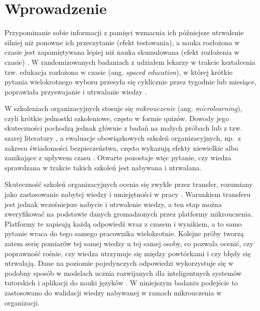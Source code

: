 \section{Wprowadzenie}

Przypominanie sobie informacji z pamięci wzmacnia ich późniejsze utrwalenie silniej niż ponowne
ich przeczytanie (efekt testowania), a nauka rozłożona w czasie jest zapamiętywana lepiej niż nauka
skumulowana (efekt rozłożenia w czasie) \citep{roediger2006,cepeda2006,cepeda2008}. W randomizowanych
badaniach z udziałem lekarzy w trakcie kształcenia tzw. edukacja rozłożona w czasie (ang.
\emph{spaced education}), w której krótkie pytania wielokrotnego wyboru przesyła się cyklicznie
przez tygodnie lub miesiące, poprawiała przyswajanie i utrwalanie wiedzy
\citep{kerfoot2007urology,kerfoot2007mededuc,kerfoot2009}.

W szkoleniach organizacyjnych stosuje się \emph{mikrouczenie} (ang. \emph{microlearning}), czyli
krótkie jednostki szkoleniowe, często w formie quizów. Dowody jego skuteczności pochodzą jednak głównie
z badań na małych próbach lub z tzw. szarej literatury \citep{taylor2022}, a ewaluacje obowiązkowych
szkoleń organizacyjnych, np.\ z zakresu świadomości bezpieczeństwa, często wykazują efekty niewielkie
albo zanikające z upływem czasu \citep{reinheimer2020,lain2022,ho2025}. Otwarte pozostaje więc
pytanie, czy wiedza sprawdzana w trakcie takich szkoleń jest nabywana i utrwalana.

Skuteczność szkoleń organizacyjnych ocenia się zwykle przez transfer, rozumiany jako zastosowanie
nabytej wiedzy i umiejętności w pracy \citep{baldwin1988,blume2010}. Warunkiem transferu jest jednak
wcześniejsze nabycie i utrwalenie wiedzy, a ten etap można zweryfikować na podstawie danych
gromadzonych przez platformy mikrouczenia. Platformy te zapisują każdą odpowiedź wraz z czasem
i wynikiem, a to samo pytanie wraca do tego samego pracownika wielokrotnie. Kolejne próby tworzą
zatem serię pomiarów tej samej wiedzy u tej samej osoby, co pozwala ocenić, czy poprawność rośnie,
czy wiedza utrzymuje się między powtórkami i czy błędy się utrwalają. Dane na poziomie pojedynczych
odpowiedzi wykorzystuje się w podobny sposób w modelach ucznia rozwijanych dla inteligentnych systemów
tutorskich i aplikacji do nauki języków \citep{corbett1994,pavlik2009,settles2016,tabibian2019,koedinger2023}.
W niniejszym badaniu podejście to zastosowano do walidacji wiedzy nabywanej w ramach mikrouczenia
w organizacji.

